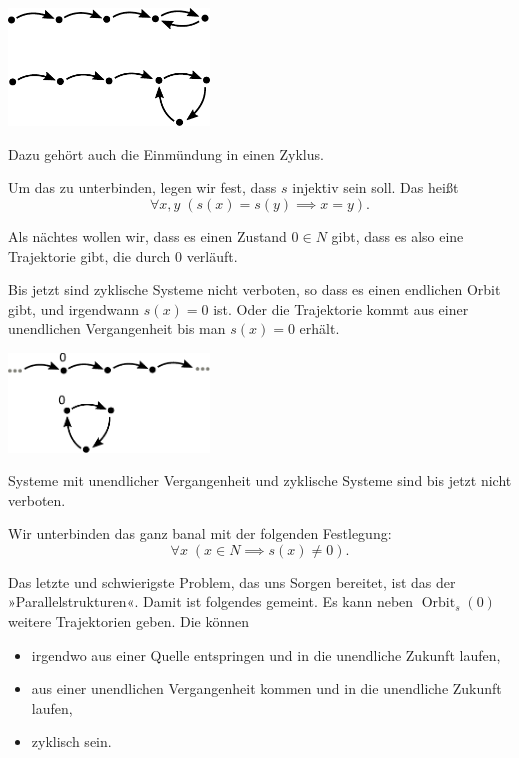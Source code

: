 \documentclass{beamer}
\newcommand{\imgcaption}[1]{{\small #1}}
\begin{document}
\begin{frame}
\begin{center}
\includegraphics[width=0.4\textwidth]{img/Zyklische-Zukunft.pdf}
\end{center}
\imgcaption{Dazu gehört auch die Einmündung in einen Zyklus.}
\end{frame}

\begin{frame}
Um das zu unterbinden, legen wir fest, dass $s$ injektiv sein soll.
Das heißt
\[\forall x,y\; (s(x)=s(y)\implies x=y).\]
\end{frame}

\begin{frame}
Als nächtes wollen wir, dass es einen Zustand $0\in N$ gibt, dass es
also eine Trajektorie gibt, die durch $0$ verläuft.
\end{frame}

\begin{frame}
Bis jetzt sind zyklische Systeme nicht verboten, so dass es einen
endlichen Orbit gibt, und irgendwann $s(x)=0$ ist. Oder die Trajektorie
kommt aus einer unendlichen Vergangenheit bis man $s(x)=0$ erhält.
\end{frame}

\begin{frame}
\begin{center}
\includegraphics[width=0.4\textwidth]{img/Zyklisches-System.pdf}
\end{center}
\imgcaption{Systeme mit unendlicher Vergangenheit und
zyklische Systeme sind bis jetzt nicht verboten.}
\end{frame}

\begin{frame}
Wir unterbinden das ganz banal mit der folgenden Festlegung:
\[\forall x\;(x\in N\implies s(x)\ne 0).\]
\end{frame}

\begin{frame}
Das letzte und schwierigste Problem, das uns Sorgen bereitet, ist
das der »Parallelstrukturen«. Damit ist folgendes gemeint.
Es kann neben $\operatorname{Orbit}_s(0)$
weitere Trajektorien geben. Die können
\begin{itemize}
\item irgendwo aus einer Quelle entspringen und in die unendliche Zukunft laufen,
\item aus einer unendlichen Vergangenheit kommen und in die unendliche Zukunft laufen,
\item zyklisch sein.
\end{itemize}
\end{frame}
\end{document}

